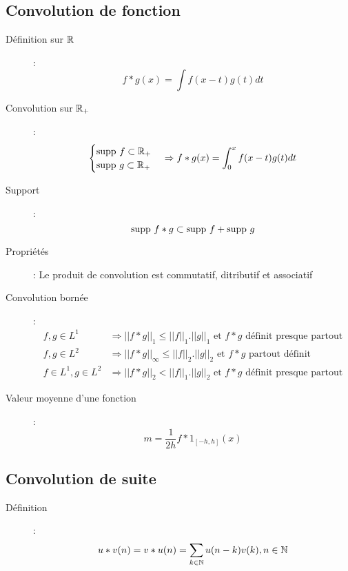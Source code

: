\subsection{Convolution de fonction}
\begin{description}
\item[Définition sur $\mathbb{R}$] :
    \[
        f*g(x)=\int f(x-t)g(t)dt
    \]
\item[Convolution sur $\mathbb{R}_+$] :
    \[
        \begin{cases}
            \textrm{supp } f\subset\mathbb{R}_+\\
            \textrm{supp } g\subset\mathbb{R}_+
        \end{cases}
        \Rightarrow
        f*g(x)=\int_0^xf(x-t)g(t)dt
    \]
\item[Support] : 
    \[
        \textrm{supp } f*g\subset\textrm{supp } f+\textrm{supp } g
    \]
\item[Propriétés] : Le produit de convolution est commutatif, ditributif et associatif
\item[Convolution bornée] :
    \begin{align*}
        f,g\in L^1&\Rightarrow||f*g||_1\le||f||_1.||g||_1\textrm{ et } f*g\textrm{ définit presque partout}\\
        f,g\in L^2 &\Rightarrow ||f*g||_\infty\le||f||_2.||g||_2\textrm{ et } f*g\textrm{ partout définit}\\
        f\in L^1, g\in L^2 &\Rightarrow||f*g||_2<||f||_1.||g||_2\textrm{ et } f*g\textrm{ définit presque partout}
    \end{align*}
\item[Valeur moyenne d'une fonction] :
    \[
        m = \frac{1}{2h}f*1_{[-h,h]}(x)
    \]
\end{description}

\subsection{Convolution de suite}
\begin{description}
\item[Définition] : 
    \[
        u*v(n)=v*u(n)=\sum_{k\in\mathbb{N}}u(n-k)v(k), n\in\mathbb{N}
    \]
\end{description}

